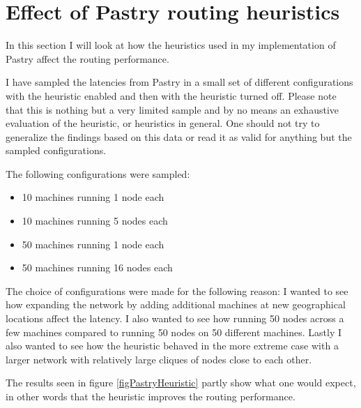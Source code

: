 
\section{Effect of Pastry routing heuristics}
In this section I will look at how the heuristics used in my implementation of Pastry affect the routing performance. 

I have sampled the latencies from Pastry in a small set of different configurations with the heuristic enabled and then with the heuristic turned off. Please note that this is nothing but a very limited sample and by no means an exhaustive evaluation of the heuristic, or heuristics in general. One should not try to generalize the findings based on this data or read it as valid for anything but the sampled configurations.

The following configurations were sampled:
\begin{itemize}
\item 10 machines running 1 node each
\item 10 machines running 5 nodes each
\item 50 machines running 1 node each
\item 50 machines running 16 nodes each
\end{itemize}

The choice of configurations were made for the following reason:
I wanted to see how expanding the network by adding additional machines at new geographical locations affect the latency.
I also wanted to see how running 50 nodes across a few machines compared to running 50 nodes on 50 different machines. Lastly I also wanted to see how the heuristic behaved in the more extreme case with a larger network with relatively large cliques of nodes close to each other.

The results seen in figure \ref{figPastryHeuristic} partly show what one would expect, in other words that the heuristic improves the routing performance.

